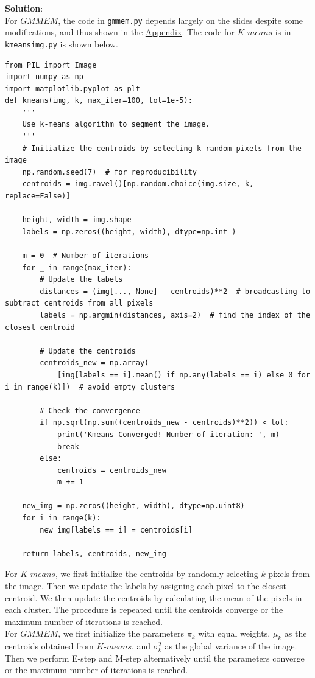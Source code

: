\documentclass[UTF8]{ctexart}
\begin{document}
\textbf{Solution}:\\
For $\textit{GMMEM}$, the code in \texttt{gmmem.py} depends largely on the slides despite some modifications, and thus shown in the \hyperlink{code1}{Appendix}.
The code for $\textit{K-means}$ is in \texttt{kmeansimg.py} is shown below.\\
\begin{lstlisting}
from PIL import Image
import numpy as np
import matplotlib.pyplot as plt
def kmeans(img, k, max_iter=100, tol=1e-5):
    '''
    Use k-means algorithm to segment the image.
    '''
    # Initialize the centroids by selecting k random pixels from the image
    np.random.seed(7)  # for reproducibility
    centroids = img.ravel()[np.random.choice(img.size, k, replace=False)]

    height, width = img.shape
    labels = np.zeros((height, width), dtype=np.int_)

    m = 0  # Number of iterations
    for _ in range(max_iter):
        # Update the labels
        distances = (img[..., None] - centroids)**2  # broadcasting to subtract centroids from all pixels
        labels = np.argmin(distances, axis=2)  # find the index of the closest centroid

        # Update the centroids
        centroids_new = np.array(
            [img[labels == i].mean() if np.any(labels == i) else 0 for i in range(k)])  # avoid empty clusters

        # Check the convergence
        if np.sqrt(np.sum((centroids_new - centroids)**2)) < tol:
            print('Kmeans Converged! Number of iteration: ', m)
            break
        else:
            centroids = centroids_new
            m += 1

    new_img = np.zeros((height, width), dtype=np.uint8)
    for i in range(k):
        new_img[labels == i] = centroids[i]

    return labels, centroids, new_img
\end{lstlisting}
For $\textit{K-means}$, we first initialize the centroids by randomly selecting $k$ pixels from the image.
Then we update the labels by assigning each pixel to the closest centroid. We then update the centroids by calculating the mean of the pixels in each cluster.
The procedure is repeated until the centroids converge or the maximum number of iterations is reached.\\
For $\textit{GMMEM}$, we first initialize the parameters $\pi_k$ with equal weights, $\mu_k$ as the centroids obtained from $\textit{K-means}$,
and $\sigma_k^2$ as the global variance of the image. Then we perform E-step and M-step alternatively until the parameters converge or the maximum number of iterations is reached.\\
\end{document}
